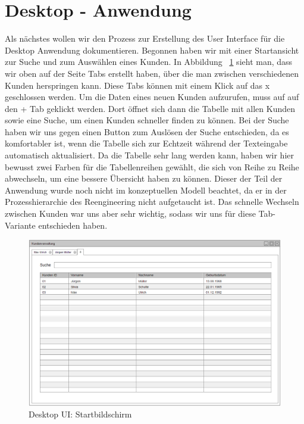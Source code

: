 \section{Desktop - Anwendung}

Als nächstes wollen wir den Prozess zur Erstellung des User Interface für die Desktop Anwendung dokumentieren. Begonnen haben wir mit einer Startansicht zur Suche und zum Auswählen eines Kunden. In Abbildung ~\ref{desktopUI:1} sieht man, dass wir oben auf der Seite Tabs erstellt haben, über die man zwischen verschiedenen Kunden herspringen kann. Diese Tabs können mit einem Klick auf das x geschlossen werden. Um die Daten eines neuen Kunden aufzurufen, muss auf auf den + Tab geklickt werden. Dort öffnet sich dann die Tabelle mit allen Kunden sowie eine Suche, um einen Kunden schneller finden zu können. Bei der Suche haben wir uns gegen einen Button zum Auslösen der Suche entschieden, da es komfortabler ist, wenn die Tabelle sich zur Echtzeit während der Texteingabe automatisch aktualisiert. Da die Tabelle sehr lang werden kann, haben wir hier bewusst zwei Farben für die Tabellenreihen gewählt, die sich von Reihe zu Reihe abwechseln, um eine bessere Übersicht haben zu können. Dieser der Teil der Anwendung wurde noch nicht im konzeptuellen Modell beachtet, da er in der Prozesshierarchie des Reengineering nicht aufgetaucht ist. Das schnelle Wechseln zwischen Kunden war uns aber sehr wichtig, sodass wir uns für diese Tab-Variante entschieden haben.

\begin{figure}[ht!]
\centering
\includegraphics[width=\linewidth]{1Startbildschirm}
\caption{Desktop UI: Startbildschirm}
\label{desktopUI:1}
\end{figure}


